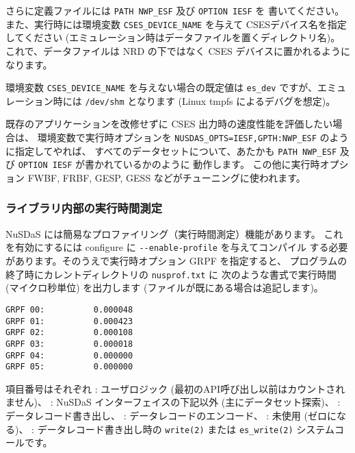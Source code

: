 さらに定義ファイルには \verb|PATH NWP_ESF| 及び \verb|OPTION IESF| を
書いてください。
また、実行時には環境変数 \verb|CSES_DEVICE_NAME| を与えて
CSESデバイス名を指定してください
(エミュレーション時はデータファイルを置くディレクトリ名)。
これで、データファイルは NRD の下ではなく CSES デバイスに置かれるようになります。

環境変数 \verb|CSES_DEVICE_NAME| を与えない場合の既定値は \verb|es_dev|
ですが、エミュレーション時には \verb|/dev/shm|
となります (Linux tmpfs によるデバグを想定)。

既存のアプリケーションを改修せずに CSES 出力時の速度性能を評価したい場合は、
環境変数で実行時オプションを
\verb|NUSDAS_OPTS=IESF,GPTH:NWP_ESF| のように指定してやれば、
すべてのデータセットについて、あたかも
\verb|PATH NWP_ESF| 及び \verb|OPTION IESF| が書かれているかのように
動作します。	
この他に実行時オプション FWBF, FRBF, GESP, GESS などがチューニングに使われます。

\subsubsection{ライブラリ内部の実行時間測定}

NuSDaS には簡易なプロファイリング（実行時間測定）機能があります。
これを有効にするには configure に \verb|--enable-profile| を与えてコンパイル
する必要があります。そのうえで実行時オプション GRPF を指定すると、
プログラムの終了時にカレントディレクトリの \verb|nusprof.txt| に
次のような書式で実行時間 (マイクロ秒単位) を出力します
(ファイルが既にある場合は追記します)。

\begin{screen}
\begin{verbatim}
GRPF 00:          0.000048
GRPF 01:          0.000423
GRPF 02:          0.000108
GRPF 03:          0.000018
GRPF 04:          0.000000
GRPF 05:          0.000000
\end{verbatim}
\end{screen}

項目番号はそれぞれ : ユーザロジック (最初のAPI呼び出し以前はカウントされません)、 : NuSDaS インターフェイスの下記以外 (主にデータセット探索)、 : データレコード書き出し、 : データレコードのエンコード、 : 未使用 (ゼロになる)、 : データレコード書き出し時の
	\verb|write(2)| または \verb|es_write(2)| システムコールです。

